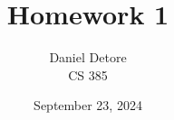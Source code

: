 \documentclass{article}
\title{Homework 1}
\author{Daniel Detore\\CS 385}
\date{September 23, 2024}
\begin{document}
\maketitle
\raggedright


\section{}
\end{document}
